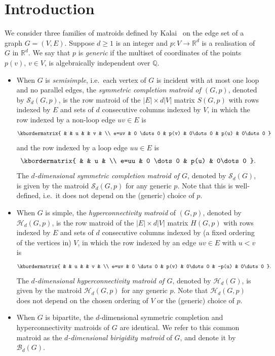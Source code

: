 \documentclass[11pt,a4paper,dvipsnames]{scrartcl}
\newcommand{\rat}{{\mathbb{Q}}}
\newcommand{\R}{{\mathbb{R}}}
\newcommand{\cB}{{\mathcal{B}}}
\newcommand{\cS}{{\mathcal{S}}}
\newcommand{\cH}{{\mathcal{H}}}
\begin{document}
\section{Introduction}

We consider three families of matroids defined by Kalai~\cite{K} on the edge set of a graph $G=(V,E)$.  Suppose $d\geq 1$ is an integer and  $p:V\to \R^d$ is  a realisation of $G$ in $\R^d$. We say that $p$ is {\em generic} if the multiset of coordinates of the points $p(v)$, $v\in V$, is algebraically independent over $\rat$.
\begin{itemize}
    \item When $G$ is {\em semisimple}, i.e.~each vertex of $G$ is incident with at most one loop and no  parallel edges, the {\em symmetric completion matroid of $(G,p)$}, denoted by $\cS_d(G,p)$, is the row matroid of the $|E|\times d|V|$ matrix $S(G,p)$ with rows indexed by $E$ and sets of $d$ consecutive columns indexed by $V$, in which the row indexed by a non-loop edge $uv\in E$ is 
    \vspace{-.5em}
\[
    \kbordermatrix{
    & &  u & & v & \\
    e=uv & 0 \dots 0 & p(v) & 0\dots 0 & p(u) & 0\dots 0
    }
\]
    and the row indexed by a loop edge $uu\in E$ is
    \vspace{-.5em}
\[
    \kbordermatrix{
    & &  u  & \\
    e=uu & 0 \dots 0 & p(u)  & 0\dots 0
    }.
\]
    The {\em $d$-dimensional  symmetric completion matroid of $G$},  denoted by $\cS_d(G)$, is given by the matroid $\cS_d(G,p)$ for any generic $p$. Note that this is well-defined, i.e.\ it does not depend on the (generic) choice of $p$.
    
    \item When $G$ is simple, the {\em hyperconnectivity  matroid} of $(G,p)$,  denoted by $\cH_d(G,p)$, is the row matroid of the $|E|\times d|V|$ matrix $H(G,p)$ with rows indexed by $E$ and sets of $d$ consecutive columns indexed by (a fixed ordering of the vertices in) $V$, in which the row indexed by an edge $uv\in E$ with $u<v$ is
    \vspace{-.5em}
\[
    \kbordermatrix{
    & &  u & & v & \\
    e=uv & 0 \dots 0 & p(v) & 0\dots 0 & -p(u) & 0\dots 0
    }.
\]
    The {\em $d$-dimensional  hyperconnectivity matroid of $G$},  denoted by $\cH_d(G)$, is given by the matroid $\cH_d(G,p)$ for any generic $p$. Note that $\cH_d(G,p)$ does not depend on the chosen ordering of $V$ or the (generic) choice of $p$.
    
    \item When $G$ is bipartite, the $d$-dimensional  symmetric completion  and hyperconnectivity  matroids of $G$ are identical. We refer to this common matroid as the {\em  $d$-dimensional birigidity  matroid} of $G$, and denote it by $\cB_d(G)$.
\end{itemize}
\end{document}
